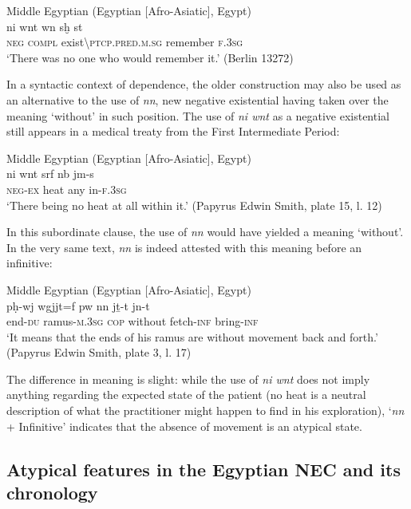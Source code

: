 \documentclass[output=paper,draft,draftmode,colorlinks,citecolor=brown]{langscibook}
\begin{document}
\ea Middle Egyptian (Egyptian [Afro-Asiatic], Egypt) \label{ex:AE48}\\
    \gll ni wnt wn sḫ{\ꜣ} st\\
    \textsc{neg} \textsc{compl} exist\textbackslash\textsc{ptcp.pred.m.sg} remember \textsc{f.3sg}\\ 
    \glt ‘There was no one who would remember it.’ (Berlin 13272) 
\z
 
In a syntactic context of dependence, the older construction may also be used as an alternative to the use of \textit{nn}, new negative existential having taken over the meaning ‘without’ in such position. The use of \textit{ni wnt} as a negative existential still appears in a medical treaty from the First Intermediate Period:  
 
\ea Middle Egyptian (Egyptian [Afro-Asiatic], Egypt) \label{ex:AE49}\\
    \gll ni wnt srf nb jm-s\\
    \textsc{neg-ex} heat any in-\textsc{f.3sg}\\ 
    \glt ‘There being no heat at all within it.’ (Papyrus Edwin Smith, plate 15, l. 12) 
\z 
 
In this subordinate clause, the use of \textit{nn} would have yielded a meaning ‘without’. In the very same text, \textit{nn} is indeed attested with this meaning before an infinitive:  
 
\ea Middle Egyptian (Egyptian [Afro-Asiatic], Egypt) \label{ex:AE50}\\
    \gll pḥ-wj wgjjt=f pw nn jṯ-t jn-t\\
    end-\textsc{du} ramus-\textsc{m.3sg} \textsc{cop} without fetch-\textsc{inf} bring-\textsc{inf}\\ 
    \glt ‘It means that the ends of his ramus are without movement back and forth.’ (Papyrus Edwin Smith, plate 3, l. 17) 
\z 
 
The difference in meaning is slight: while the use of \textit{ni wnt} does not imply anything regarding the expected state of the patient (no heat is a neutral description of what the practitioner might happen to find in his exploration), ‘\textit{nn} + Infinitive’ indicates that the absence of movement is an atypical state.  

\subsection{Atypical features in the Egyptian NEC and its chronology}\label{s:AE3-3}
\end{document}

